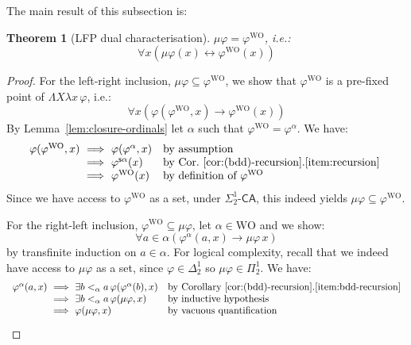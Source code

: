 \documentclass[10pt,a4paper]{amsart}
\theoremstyle{plain}
\newtheorem{theorem}[theorem]{Theorem}
\newtheorem{lemma}[lemma]{Lemma}
\theoremstyle{definition}
\renewcommand{\phi}{\varphi}
\newcommand{\oldtodo}[1]{\todo{#1}} %
\renewcommand{\todo}[1]{}
\theoremstyle{plain}
\theoremstyle{definition} %
\renewcommand{\succ}{\mathsf s}
\newcommand{\limp}{\to}
\newcommand{\liff}{\leftrightarrow}
\newcommand{\mufo}[3]{\mu #1 \lambda #2 #3}
\newcommand{\Sin}[2]{\Sigma^{#1}_{#2}}
\newcommand{\Pin}[2]{\Pi^{#1}_{#2}}
\newcommand{\Din}[2]{\Delta^{#1}_{#2}}
\newcommand{\CA}{\mathsf{CA}}
\newcommand{\ca}[1]{#1\text{-}\CA}
\newcommand{\WO}{\mathrm{WO}}
\newcommand{\oper}[3]{\Lambda #1 \lambda #2 \, #3}
\newcommand{\apprx}[4]{(\oper #1 #2 #3)^{#4}}
\begin{document}


The main result of this subsection is:
\begin{theorem}
[LFP dual characterisation]
\label{thm:muphi-is-phiwo}
$\mu \phi =  \phi^\WO$, i.e.:
\[
\forall x \left(
\mu \phi (x) \liff \phi^\WO(x)
\right)
\]
\end{theorem}
\begin{proof}
For the left-right inclusion, $\mu \phi \subseteq  \phi^\WO$, we show that $\phi^\WO$ is a pre-fixed point of $\oper X x \phi$, i.e.:
\[
\forall x (\phi (\phi^\WO,x) \limp \phi^\WO (x))
\]
By Lemma~\ref{lem:closure-ordinals} let $\alpha $ such that $\phi^\WO = \phi^\alpha$.
We have:
\[
\begin{array}{r@{\ \implies \ }ll}
     \phi(\phi^\WO,x) & \phi(\phi^\alpha,x) & \text{by assumption} \\
     & \phi^{\succ \alpha}(x) & \text{by Cor.~\ref{cor:(bdd)-recursion}.\ref{item:recursion} } \\
     & \phi^\WO (x) & \text{by definition of $\phi^\WO$}
\end{array}
\]
Since we have access to $\phi^\WO$ as a set, under $\ca{\Sin 1 2}$, this indeed yields $\mu \phi \subseteq \phi^\WO$.

For the right-left inclusion, $\phi^\WO \subseteq \mu \phi$, let $\alpha \in \WO$ and we show:
\[
\forall a \in \alpha ( \phi^\alpha(a,x) \limp \mu \phi\, x)
\]
by transfinite induction on $a \in \alpha$.
For logical complexity, recall that we indeed have access to $\mu\phi$ as a set, since $\phi\in \Din 1 2$ so $\mu\phi \in \Pin 1 2$.
We have:
\[
\begin{array}[b]{r@{\ \implies \ }ll}
     \phi^\alpha(a,x) & \exists b<_\alpha a \, \phi(\phi^\alpha(b),x) & \text{by Corollary~\ref{cor:(bdd)-recursion}.\ref{item:bdd-recursion}}\\
     & \exists b<_\alpha a \, \phi(\mu\phi,x) & \text{by inductive hypothesis} \\
     & \phi(\mu\phi,x) & \text{by vacuous quantification} \tag*{\qed}
\end{array}
\]
\renewcommand{\qed}{}
\end{proof}
\end{document}
